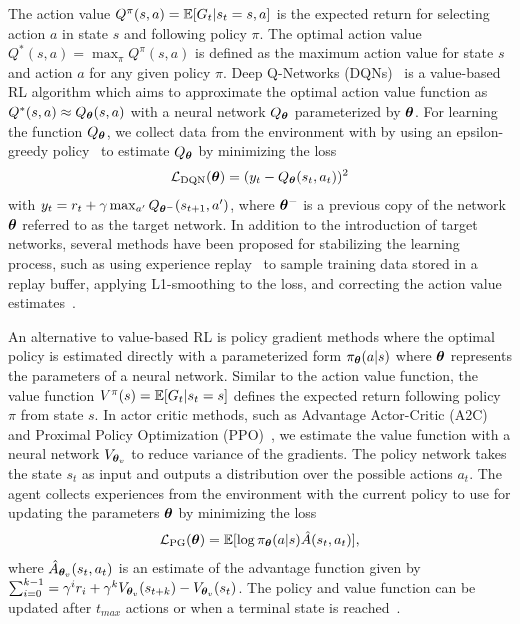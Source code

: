 The action value $Q^{\pi}(s, a) = \mathbb{E}[G_t | s_t=s, a]$  is the expected return for selecting action $a$ in state $s$ and following policy $\pi$. The optimal action value $Q^{*}(s, a) = \max_{\pi} Q^{\pi}(s, a)$ is defined as the maximum action value for state $s$ and action $a$ for any given policy $\pi$. Deep Q-Networks (DQNs)~ is a value-based RL algorithm which aims to approximate the optimal action value function as $Q^{*}(s, a) \approx Q_{{\bm{\theta}}}(s, a)$ with a neural network $Q_{{\bm{\theta}}}$ parameterized by ${\bm{\theta}}$. For learning the function $Q_{{\bm{\theta}}}$, we collect data from the environment with by using an epsilon-greedy policy~ to estimate $Q_{{\bm{\theta}}}$ by minimizing the loss
\begin{align}\label{eq:dqn_loss}
	{\mathcal{L}}_{\text{DQN}}({\bm{\theta}}) = (y_t - Q_{{\bm{\theta}}}(s_t, a_t))^2
\end{align}
with $y_t = r_t + \gamma \max_{a'} Q_{{\bm{\theta}}^{-}}(s_{t+1}, a')$, where ${\bm{\theta}}^{-}$ is a previous copy of the network ${\bm{\theta}}$ referred to as the target network. In addition to the introduction of target networks, several methods have been proposed for stabilizing the learning process, such as using experience replay~ to sample training data stored in a replay buffer, applying L1-smoothing to the loss, and correcting the action value estimates~. 

An alternative to value-based RL is policy gradient methods where the optimal policy is estimated directly with a parameterized form $\pi_{{\bm{\theta}}}(a | s)$ where ${\bm{\theta}}$ represents the parameters of a neural network. 
Similar to the action value function, the value function $V^{\pi}(s) = \mathbb{E}[G_t | s_t=s]$ defines the expected return following policy $\pi$ from state $s$. In actor critic methods, such as Advantage Actor-Critic (A2C)~ and Proximal Policy Optimization (PPO)~, we estimate the value function with a neural network $V_{{\bm{\theta}}_v}$ to reduce variance of the gradients. 
The policy network takes the state $s_t$ as input and outputs a distribution over the possible actions $a_t$. The agent collects experiences from the environment with the current policy to use for updating the parameters ${\bm{\theta}}$ by minimizing the loss 
\begin{align}\label{eq:pg_loss}
	{\mathcal{L}}_{\text{PG}}({\bm{\theta}}) = \mathbb{E}[\log \pi_{{\bm{\theta}}}(a | s) \hat{A}(s_t, a_t)], 
\end{align}
where $\hat{A}_{{\bm{\theta}}_v}(s_t, a_t)$ is an estimate of the advantage function given by $\sum_{i=0}^{k-1} = \gamma^{i} r_i + \gamma^{k} V_{{\bm{\theta}}_v}(s_{t+k}) - V_{{\bm{\theta}}_v}(s_{t})$. The policy and value function can be updated after $t_{max}$ actions or when a terminal state is reached~.

